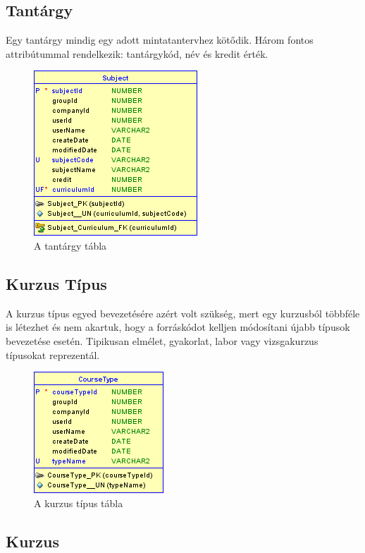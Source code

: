 \documentclass[hidelinks, 12pt, a4paper]{report}
\begin{document}
\subsection{Tantárgy}

Egy tantárgy mindig egy adott mintatantervhez kötődik. Három fontos attribútummal rendelkezik: tantárgykód, név és kredit érték.

\begin{figure}[H]
    \centering
	\includegraphics{subject.png}
	\caption{A tantárgy tábla}
\end{figure}

\subsection{Kurzus Típus}

A kurzus típus egyed bevezetésére azért volt szükség, mert egy kurzusból többféle is létezhet és nem akartuk, hogy a forráskódot kelljen módosítani újabb típusok bevezetése esetén. Tipikusan elmélet, gyakorlat, labor vagy vizsgakurzus típusokat reprezentál.

\begin{figure}[H]
    \centering
	\includegraphics{course_type.png}
	\caption{A kurzus típus tábla}
\end{figure}

\subsection{Kurzus}
\end{document}
